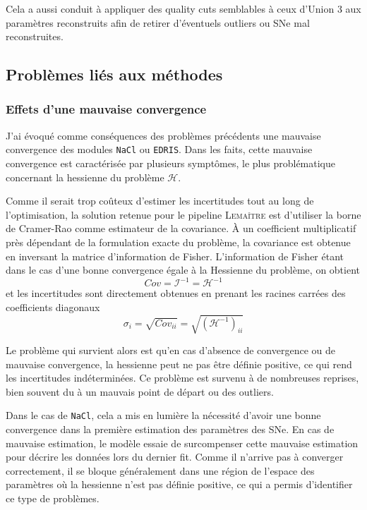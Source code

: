 \documentclass{book}
\def\lemaitre{\textsc{Lemaître}\xspace}
\def\nacl{\texttt{NaCl}\xspace}
\def\edris{\texttt{EDRIS}\xspace}
\let\mcl\mathcal
\begin{document}
Cela a aussi conduit à appliquer des quality cuts semblables à ceux d'Union 3 aux paramètres reconstruits afin de retirer d'éventuels outliers ou SNe mal reconstruites.

\subsection{Problèmes liés aux méthodes}

\subsubsection{Effets d'une mauvaise convergence }

J'ai évoqué comme conséquences des problèmes précédents une mauvaise convergence des modules \nacl ou \edris. Dans les faits, cette mauvaise convergence est caractérisée par plusieurs symptômes, le plus problématique concernant la hessienne du problème $\mcl H$.

Comme il serait trop coûteux d'estimer les incertitudes tout au long de l'optimisation, la solution retenue pour le pipeline \lemaitre est d'utiliser la borne de Cramer-Rao comme estimateur de la covariance. À un coefficient multiplicatif près dépendant de la formulation exacte du problème, la covariance est obtenue en inversant la matrice d'information de Fisher. L'information de Fisher étant dans le cas d'une bonne convergence égale à la Hessienne du problème, on obtient
\begin{equation}
	Cov = \mcl I^{-1} = \mcl H^{-1}
\end{equation}
et les incertitudes sont directement obtenues en prenant les racines carrées des coefficients diagonaux
\begin{equation}
	\sigma_i = \sqrt{Cov_{ii}} = \sqrt{(\mcl H^{-1})_{ii}}
\end{equation}

Le problème qui survient alors est qu'en cas d'absence de convergence ou de mauvaise convergence, la hessienne peut ne pas être définie positive, ce qui rend les incertitudes indéterminées. Ce problème est survenu à de nombreuses reprises, bien souvent du à un mauvais point de départ ou des outliers.

Dans le cas de \nacl, cela a mis en lumière la nécessité d'avoir une bonne convergence dans la première estimation des paramètres des SNe. En cas de mauvaise estimation, le modèle essaie de surcompenser cette mauvaise estimation pour décrire les données lors du dernier fit. Comme il n'arrive pas à converger correctement, il se bloque généralement dans une région de l'espace des paramètres où la hessienne n'est pas définie positive, ce qui a permis d'identifier ce type de problèmes.
\end{document}
